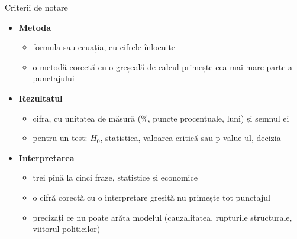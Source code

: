 \begin{frame}{Criterii de notare}
\itemsize{\small}
\begin{itemize}
    \item \textbf{Metoda}
    \begin{itemize}
        \item formula sau ecuația, cu cifrele înlocuite
        \item o metodă corectă cu o greșeală de calcul primește cea mai mare parte a punctajului
    \end{itemize}
    \item \textbf{Rezultatul}
    \begin{itemize}
        \item cifra, cu unitatea de măsură (\%, puncte procentuale, luni) și semnul ei
        \item pentru un test: $H_0$, statistica, valoarea critică sau p-value-ul, decizia
    \end{itemize}
    \item \textbf{Interpretarea}
    \begin{itemize}
        \item trei pînă la cinci fraze, statistice și economice
        \item o cifră corectă cu o interpretare greșită nu primește tot punctajul
        \item precizați ce nu poate arăta modelul (cauzalitatea, rupturile structurale, viitorul politicilor)
    \end{itemize}
\end{itemize}
\end{frame}


